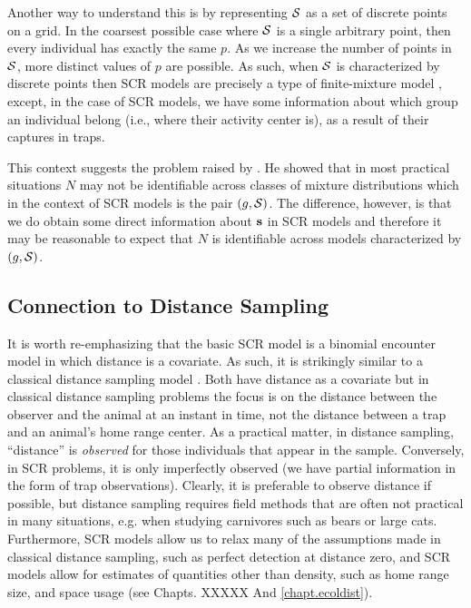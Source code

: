 Another way to understand this is by representing ${\cal S}$ as a set
of discrete points on a grid. In the coarsest possible case where
${\cal S}$ is a single arbitrary point, then every individual has
exactly the same $p$. As we increase the number of points in ${\cal
  S}$,  more distinct values of $p$ are possible. As such, when
${\cal S}$ is characterized by discrete points then SCR models are
precisely a type of finite-mixture model \citep{norris_pollock:1996,
  pledger:2000}, except, in the case of SCR models, we have some information about which
group an individual belong (i.e., where their activity center is), as
a result of their captures in traps.

This context suggests the problem raised by \citet{link:2003}. He
showed that in most practical situations $N$ may not be identifiable
across classes of mixture distributions which in the context of SCR
models is the pair $(g, {\cal S})$.  The difference, however, is that
we do obtain some direct information about ${\bf s}$ in SCR models and
therefore it may be reasonable to expect that
$N$ is identifiable across models characterized by $(g,{\cal
  S})$.

\subsection{Connection to Distance Sampling}

It is worth re-emphasizing that the basic SCR model is a binomial
encounter model in which distance is a covariate. As such, it is
strikingly similar to a classical distance sampling model \citep{buckland_etal:2002}. Both have
distance as a covariate but in classical distance sampling problems
the focus is on the distance between the observer and the animal at an
instant in time, not the distance between a trap and an animal's home
range center. As a practical matter, in distance sampling, ``distance'' is {\it
  observed} for those individuals that appear in the
sample. Conversely, in SCR problems, it is only imperfectly observed
(we have partial information in the form of trap observations).
Clearly, it is preferable to observe distance if possible, but 
distance sampling requires field methods that
are often not practical in many situations, e.g. when studying
carnivores such as bears or large cats. Furthermore, SCR models allow us to relax many of the
assumptions made in classical distance sampling, such as perfect detection at distance zero, and SCR models allow
for estimates of quantities other than density, such as home range
size, and space usage (see Chapts. XXXXX And \ref{chapt.ecoldist}).


